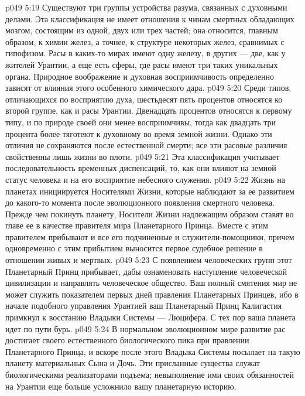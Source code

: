 \vs p049 5:19 \pc {}\bibnobreakspace {} Существуют три группы устройства разума, связанных с духовными делами. Эта классификация не имеет отношения к чинам смертных обладающих мозгом, состоящим из одной, двух или трех частей; она относится, главным образом, к химии желез, а точнее, к структуре некоторых желез, сравнимых с гипофизом. Расы в каких\hyp{}то мирах имеют одну железу, в других --- две, как у жителей Урантии, а еще есть сферы, где расы имеют три таких уникальных органа. Природное воображение и духовная восприимчивость определенно зависят от влияния этого особенного химического дара.
\vs p049 5:20 Среди типов, отличающихся по восприятию духа, шестьдесят пять процентов относятся ко второй группе, как и расы Урантии. Двенадцать процентов относятся к первому типу, и по природе своей они менее восприимчивы, тогда как двадцать три процента более тяготеют к духовному во время земной жизни. Однако эти отличия не сохраняются после естественной смерти; все эти расовые различия свойственны лишь жизни во плоти.
\vs p049 5:21 \pc {}\bibnobreakspace {} Эта классификация учитывает последовательность временных диспенсаций, то, как они влияют на земной статус человека и на его восприятие небесного служения.
\vs p049 5:22 Жизнь на планетах инициируется Носителями Жизни, которые наблюдают за ее развитием до какого\hyp{}то момента после эволюционного появления смертного человека. Прежде чем покинуть планету, Носители Жизни надлежащим образом ставят во главе ее в качестве правителя мира Планетарного Принца. Вместе с этим правителем прибывают и все его подчиненные и служители\hyp{}помощники, причем одновременно с этим прибытием выносится первое судебное решение в отношении живых и мертвых.
\vs p049 5:23 С появлением человеческих групп этот Планетарный Принц прибывает, дабы ознаменовать наступление человеческой цивилизации и направлять человеческое общество. Ваш полный смятения мир не может служить показателем первых дней правления Планетарных Принцев, ибо в начале подобного управления Урантией ваш Планетарный Принц Калигастия примкнул к восстанию Владыки Системы --- Люцифера. С тех пор ваша планета идет по пути бурь.
\vs p049 5:24 В нормальном эволюционном мире развитие рас достигает своего естественного биологического пика при правлении Планетарного Принца, и вскоре после этого Владыка Системы посылает на такую планету материальных Сына и Дочь. Эти присланные существа служат биологическими реализаторами подъема; невыполнение ими своих обязанностей на Урантии еще больше усложнило вашу планетарную историю.
